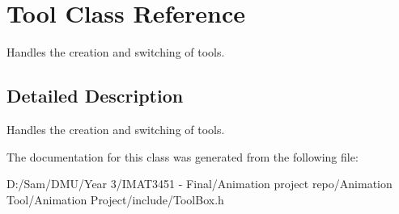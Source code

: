 \hypertarget{class_tool}{}\section{Tool Class Reference}
\label{class_tool}


Handles the creation and switching of tools.  




\subsection{Detailed Description}
Handles the creation and switching of tools. 

The documentation for this class was generated from the following file\+:\begin{DoxyCompactItemize}
\item 
D\+:/\+Sam/\+D\+M\+U/\+Year 3/\+I\+M\+A\+T3451 -\/ Final/\+Animation project repo/\+Animation Tool/\+Animation Project/include/Tool\+Box.\+h\end{DoxyCompactItemize}
